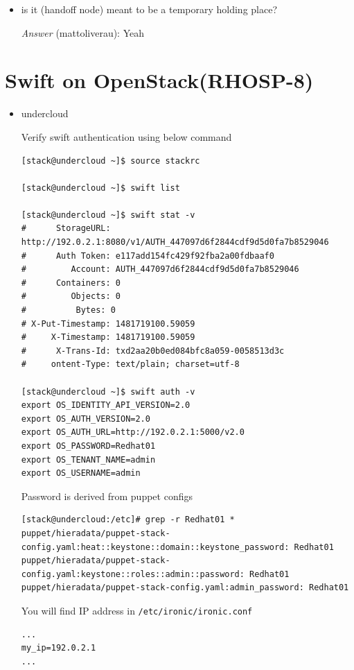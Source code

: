 \documentclass{article}
\begin{document}
\begin{itemize}
\item is it (handoff node) meant to be a temporary holding place?

\emph{Answer} (mattoliverau): Yeah
\end{itemize}

\section{Swift on OpenStack(RHOSP-8)}
\label{sec:orgf29bdc2}

\begin{itemize}
\item undercloud

Verify swift authentication using below command

\begin{verbatim}
[stack@undercloud ~]$ source stackrc

[stack@undercloud ~]$ swift list

[stack@undercloud ~]$ swift stat -v
#      StorageURL: http://192.0.2.1:8080/v1/AUTH_447097d6f2844cdf9d5d0fa7b8529046
#      Auth Token: e117add154fc429f92fba2a00fdbaaf0
#         Account: AUTH_447097d6f2844cdf9d5d0fa7b8529046
#      Containers: 0
#         Objects: 0
#      	   Bytes: 0
# X-Put-Timestamp: 1481719100.59059
#     X-Timestamp: 1481719100.59059
#      X-Trans-Id: txd2aa20b0ed084bfc8a059-0058513d3c
#     ontent-Type: text/plain; charset=utf-8

[stack@undercloud ~]$ swift auth -v
export OS_IDENTITY_API_VERSION=2.0
export OS_AUTH_VERSION=2.0
export OS_AUTH_URL=http://192.0.2.1:5000/v2.0
export OS_PASSWORD=Redhat01
export OS_TENANT_NAME=admin
export OS_USERNAME=admin
\end{verbatim}

Password is derived from puppet configs

\begin{verbatim}
[stack@undercloud:/etc]# grep -r Redhat01 *
puppet/hieradata/puppet-stack-config.yaml:heat::keystone::domain::keystone_password: Redhat01
puppet/hieradata/puppet-stack-config.yaml:keystone::roles::admin::password: Redhat01
puppet/hieradata/puppet-stack-config.yaml:admin_password: Redhat01
\end{verbatim}

You will find IP address in \texttt{/etc/ironic/ironic.conf}

\begin{verbatim}
...
my_ip=192.0.2.1
...
\end{verbatim}


\end{itemize}
\end{document}

